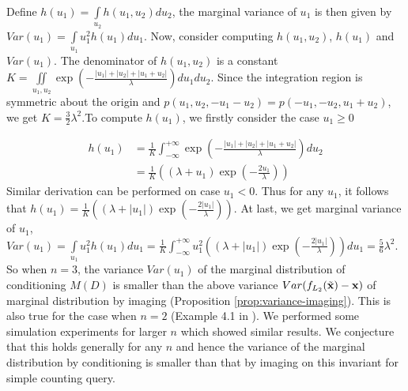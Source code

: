 \documentclass[11pt]{article}
\begin{document}
Define $h(u_1)=\underset{u_2}\int h(u_1,u_2) d u_2$, the marginal variance of $u_1$ is then given by ${Var}(u_1)=\underset{u_1}{\int} u_1^2 h(u_1) d u_1$.
Now, consider computing $h(u_1,u_2)$, $h(u_1)$ and ${Var}(u_1)$.
The denominator of $h(u_1,u_2)$ is a constant $K=\underset{u_1,u_2} \iint \exp \left(-\frac{|u_1|+|u_2|+|u_1+u_2|}{\lambda}\right) d u_{1} d u_{2}$. Since the integration region is symmetric about the origin and $p\left(u_{1}, u_{2}, -u_{1}-u_{2}\right)=p\left(-u_{1}, -u_{2}, u_{1}+u_{2}\right)$, we get $K= \frac{3}{2}{\lambda}^2$.To compute $h(u_1)$, we firstly consider the case $u_1\ge0$



\begin{eqnarray*}
    h(u_1)&=\frac{1}{K}\int_{-\infty}^{+\infty} \exp \left(-\frac{|u_1|+|u_2|+|u_1+u_2|}{\lambda}\right) d u_2\\
        &=\frac{1}{K}\left(\left(\lambda+u_1\right)\exp\left(-\frac{2u_1}{\lambda}\right)\right)
\end{eqnarray*}
Similar derivation can be performed on case $u_1<0$. Thus for any $u_1$, it follows that $h(u_1)=\frac{1}{K}\left(\left(\lambda+|u_1|\right)\exp\left(-\frac{2|u_1|}{\lambda}\right)\right)$. 
At last, we get marginal variance of $u_1$, ${Var}(u_1)=\underset{u_1}{\int} u_1^2 h(u_1) d u_1
    =\frac{1}{K} \int_{-\infty}^{+\infty}u_1^2\left(\left(\lambda+|u_1|\right)\exp\left(-\frac{2|u_1|}{\lambda}\right)\right) d u_1
    =\frac{5}{6}{\lambda}^2$.
So when $n=3$, the variance $Var(u_1)$ of the marginal distribution of conditioning $M(D)$ is smaller than the above variance $Var(f_{L_2}(\tilde{\bold{x}})-\bold{x})$ of marginal distribution by imaging (Proposition \ref{prop:variance-imaging}).  This is also true for the case when $n=2$ (Example 4.1 in \cite{GongM20}). We performed some simulation experiments for larger $n$ which showed similar results.  We conjecture that this holds generally for any $n$ and hence the variance of the marginal distribution by conditioning is smaller than that by imaging on this invariant for simple counting query.  
\end{document}

